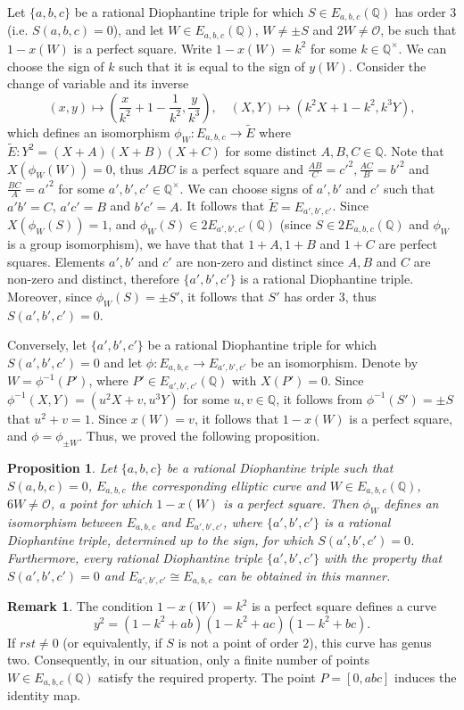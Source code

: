 \documentclass[a4paper]{amsart}
\theoremstyle{plain}
\newtheorem{proposition}[theorem]{Proposition}
\def\Q{\mathbb{Q}}
\theoremstyle{definition}
\newtheorem{remark}{Remark}
\begin{document}
Let $\{a,b,c\}$ be a rational Diophantine triple for which $S \in E_{a,b,c}(\Q)$ has order $3$ (i.e. $S(a,b,c)=0$), and let $W\in E_{a,b,c}(\Q)$, $W\ne \pm S$ and $2W \ne \mathcal{O}$, be such that $1-x(W)$ is a perfect square. Write $1-x(W)=k^2$ for some $k\in \Q^\times$. We can choose the sign of $k$ such that it is equal to the sign of $y(W)$. Consider the change of variable and its inverse
\begin{equation*}
(x,y)\mapsto \left(\frac{x}{k^2}+1-\frac{1}{k^2},\frac{y}{k^3}\right),\quad (X,Y)\mapsto \left(k^2 X+1-k^2,k^3 Y\right),
\end{equation*}
which defines an isomorphism $\phi_W: E_{a,b,c} \rightarrow \tilde{E}$ where $\tilde{E}:Y^2=(X+A)(X+B)(X+C)$ for some distinct $A,B,C \in \Q$.
Note that $X(\phi_W(W))=0$, thus $ABC$ is a perfect square and $\frac{AB}{C}=c'^2, \frac{AC}{B}=b'^2$ and $\frac{BC}{A}=a'^2$ for some $a',b',c' \in \Q^\times$. We can choose signs of $a',b'$ and $c'$ such that $a'b'=C$, $a'c'=B$ and $b'c'=A$. It follows that $\tilde{E}=E_{a',b',c'}$. Since $X(\phi_W(S))=1$, and $\phi_W(S) \in 2 E_{a',b',c'}(\Q)$ (since $S\in 2E_{a,b,c}(\Q)$ and $\phi_W$ is a group isomorphism), we have that that $1+A,1+B$ and $1+C$ are perfect squares. Elements $a',b'$ and $c'$ are non-zero and distinct since $A,B$ and $C$ are non-zero and distinct, therefore $\{a',b',c'\}$ is a rational Diophantine triple. Moreover, since $\phi_W(S)=\pm S'$, it follows that $S'$ has order $3$, thus $S(a',b',c')=0$.

Conversely, let $\{a',b',c'\}$ be a rational Diophantine triple for which $S(a',b',c')=0$ and let $\phi:E_{a,b,c}\rightarrow E_{a',b',c'}$ be an isomorphism.
Denote by $W=\phi^{-1}(P')$, where $P'\in E_{a',b',c'}(\Q)$ with $X(P')=0$. Since $\phi^{-1}(X,Y)=(u^2 X+v, u^3 Y)$ for some $u,v \in \Q$, it follows from $\phi^{-1}(S')=\pm S$ that
$u^2+v=1$. Since $x(W)=v$, it follows that $1-x(W)$ is a perfect square, and  $\phi=\phi_{\pm W}$. Thus, we proved the following proposition.

\begin{proposition}\label{prop: phi}
	Let $\{a,b,c\}$ be a rational Diophantine triple such that $S(a,b,c)=0$, $E_{a,b,c}$ the corresponding elliptic curve and $W\in E_{a,b,c}(\Q)$, $6W \ne \mathcal{O}$, a point for which $1-x(W)$ is a perfect square. Then $\phi_W$ defines an isomorphism between $E_{a,b,c}$ and $E_{a',b',c'}$, where $\{a',b',c'\}$ is a rational Diophantine triple, determined up to the sign, for which $S(a',b',c')=0$. Furthermore, every rational Diophantine triple $\{a',b',c'\}$ with the property that $S(a',b',c')=0$ and $E_{a',b',c'} \cong E_{a,b,c}$ can be obtained in this manner.
\end{proposition}
\begin{remark}
The condition  $1-x(W)=k^2$ is a perfect square defines a curve $$y^2=(1-k^2+ab)(1-k^2+ac)(1-k^2+bc).$$ If $rst\ne 0$ (or equivalently, if $S$ is not a point of order $2$), this curve has genus two. Consequently, in our situation, only a finite number of points $W\in E_{a,b,c}(\Q)$ satisfy the required property. The point $P=[0,abc]$ induces the identity map.
\end{remark}
\end{document}
